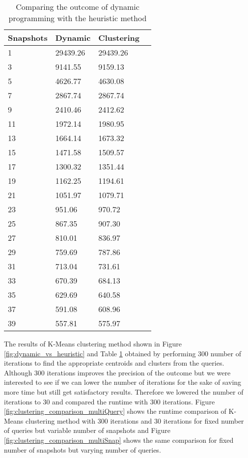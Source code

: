 \begin {center}
\begin{table}
	\centering
	\caption{Comparing the outcome of dynamic programming with the heuristic method}
	\label {table:dynamic_vs_heuristic}
	\begin{tabular}{p{2cm}p{3cm}p{3cm}p{3cm}}
		\hline
		Snapshots & Dynamic  & Clustering \\ \hline
		1 & 29439.26  & 29439.26  \\  
		3 & 9141.55  & 9159.13  \\
		5 & 4626.77  & 4630.08  \\
		7 & 2867.74  & 2867.74  \\
		9 & 2410.46  & 2412.62 \\
		11 & 1972.14  & 1980.95  \\
		13 & 1664.14  & 1673.32  \\
		15 & 1471.58  & 1509.57  \\
		17 & 1300.32  & 1351.44  \\
		19 & 1162.25  & 1194.61  \\
		21 & 1051.97  & 1079.71  \\
		23 & 951.06  & 970.72  \\
		25 & 867.35  & 907.30  \\
		27 & 810.01  & 836.97  \\
		29 & 759.69  & 787.86  \\
		31 & 713.04  & 731.61  \\
		33 & 670.39  & 684.13  \\
		35 & 629.69  & 640.58  \\
		37 & 591.08  & 608.96  \\
		39 & 557.81  & 575.97  \\\hline
	\end{tabular}
\end{table}
\end{center}

The results of K-Means clustering method shown in Figure \ref{fig:dynamic_vs_heuristic} and Table \ref{table:dynamic_vs_heuristic} obtained by performing 300 number of iterations to find the appropriate centroids and clusters from the queries. Although 300 iterations improves the precision of the outcome but we were interested to see if we can lower the number of iterations for the sake of saving more time but still get satisfactory results. Therefore we lowered the number of iterations to 30 and compared the runtime with 300 iterations. Figure \ref{fig:clustering_comparison_multiQuery} shows the runtime comparison of K-Means clustering method with 300 iterations and 30 iterations for fixed number of queries but variable number of snapshots and Figure \ref{fig:clustering_comparison_multiSnap} shows the same comparison for fixed number of snapshots but varying number of queries.


